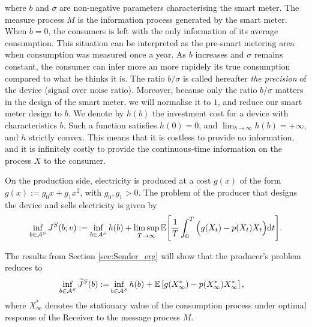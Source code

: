 \documentclass[a4paper,10pt]{article}
\newcommand{\EE}{\mathbb{E}}
\newcommand{\D}{\mathrm{d}}
\theoremstyle{definition}
\theoremstyle{plain}
\numberwithin{equation}{section}
\begin{document}
where $b$ and $\sigma$ are non-negative parameters characterising the smart meter. The measure process $M$ is the information process generated by the smart meter. When $b=0$, the consumers is left with the only information of its average consumption. This situation can be interpreted as the pre-smart metering area when consumption was measured once a year. As $b$ increases and $\sigma$ remains constant, the consumer can infer more an more rapidely its true consumption compared to what he thinks it is.  The ratio ${b}/{\sigma}$ is called hereafter {\em the precision} of the device (signal over noise ratio). Moreover, because only the ratio $b/\sigma$ matters in the design of the smart meter, we will normalise it to $1$, and reduce our smart meter design to $b$. We denote by $h(b)$ the investment cost for a device with characteristics $b$. Such a function satisfies $h(0) = 0$,  and $\lim_{b\to \infty} h(b)  = +\infty$, and $h$ strictly convex. This means that it is costless to provide no information, and it is infinitely costly to provide the continuous-time information on the process $X$ to the consumer. 

On the production side, electricity is produced at a cost $g(x)$ of the form $g(x) := g_0 x +  g_1 x^2$, with $g_0,g_1>0$.  The problem of the producer that designs the device and sells electricity is given by
\begin{align}
	\inf_{b \in \mathcal A^{\rm S}} J^{\rm {S}}(b; v) :=  \inf_{b \in \mathcal A^{\rm S}} h(b) + \limsup_{T \to \infty}  \EE\Bigg[ \frac{1}{T} \int_0^T \Big( g(X_t) - p(X_t) X_t \Big) \D t\Bigg].
\end{align}

The results from Section \ref{sec:Sender_erg} will show that the producer's problem reduces to
  \begin{align*}
     \inf_{b \in \mathcal A^{\rm S}} \widetilde J^{\rm S} (b) := & \inf_{b \in \mathcal A^{\rm S}} h(b)+ \EE  \left[ g(X^*_{\infty}) - p(X^*_{\infty}) X^*_{\infty} \right],
    \end{align*}
where $X^*_{\infty}$ denotes the stationary value of the consumption process under optimal response of the Receiver to the message process $M$.

\medskip
\end{document}
